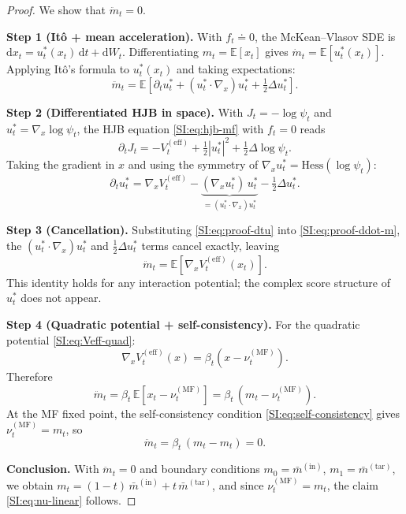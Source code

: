 \documentclass[11pt,onecolumn]{article}
\newcommand{\dd}{\mathrm{d}}
\newcommand{\MF}{\mathrm{MF}}
\newcommand{\Veff}{V^{(\mathrm{eff})}}
\begin{document}
\begin{proof}
We show that $\ddot m_t = 0$.
\medskip

\noindent\textbf{Step 1 (It\^o + mean acceleration).}
With $f_t\doteq 0$, the McKean--Vlasov SDE is
$\dd x_t = u_t^*(x_t)\,\dd t + \dd W_t$.
Differentiating $m_t = \mathbb{E}[x_t]$ gives
$\dot m_t = \mathbb{E}[u_t^*(x_t)]$.
Applying It\^o's formula to $u_t^*(x_t)$ and taking expectations:
\begin{equation}
  \ddot m_t
  = \mathbb{E}\!\left[
      \partial_t u_t^*
      + (u_t^*\cdot\nabla_x)u_t^*
      + \tfrac{1}{2}\Delta u_t^*
    \right].
  \label{SI:eq:proof-ddot-m}
\end{equation}

\noindent\textbf{Step 2 (Differentiated HJB in space).} With $J_t = -\log\psi_t$ and $u_t^* = \nabla_x\log\psi_t$, the HJB equation \eqref{SI:eq:hjb-mf} with $f_t=0$ reads
\begin{equation*}
  \partial_t J_t= -\Veff_t + \tfrac{1}{2}|u_t^*|^2 + \tfrac{1}{2}\Delta\log\psi_t.
\end{equation*}
Taking the gradient in $x$ and using the symmetry of $\nabla_xu_t^* = \mathrm{Hess}(\log\psi_t)$:
\begin{equation}
  \partial_t u_t^*= \nabla_x\Veff_t- \underbrace{(\nabla_xu_t^*)\,u_t^*}_{=(u_t^*\cdot\nabla_x)u_t^*}- \tfrac{1}{2}\Delta u_t^*.
  \label{SI:eq:proof-dtu}
\end{equation}

\noindent\textbf{Step 3 (Cancellation).} Substituting \eqref{SI:eq:proof-dtu} into \eqref{SI:eq:proof-ddot-m}, the $(u_t^*\cdot\nabla_x)u_t^*$ and $\tfrac{1}{2}\Delta u_t^*$ terms cancel exactly, leaving
\begin{equation*}
  \ddot m_t = \mathbb{E}\!\left[\nabla_x\Veff_t(x_t)\right].
\end{equation*}
This identity holds for any interaction potential; the complex score structure of $u_t^*$ does not appear.

\noindent\textbf{Step 4 (Quadratic potential + self-consistency).} For the quadratic potential \eqref{SI:eq:Veff-quad}:
\begin{equation*}
  \nabla_x\Veff_t(x) = \beta_t(x - \nu_t^{(\MF)}).
\end{equation*}
Therefore
\begin{equation*}
  \ddot m_t
  = \beta_t\,\mathbb{E}[x_t - \nu_t^{(\MF)}]
  = \beta_t\,(m_t - \nu_t^{(\MF)}).
\end{equation*}
At the MF fixed point, the self-consistency condition
\eqref{SI:eq:self-consistency} gives $\nu_t^{(\MF)} = m_t$, so
\begin{equation*}
  \ddot m_t = \beta_t\,(m_t - m_t) = 0.
\end{equation*}

\noindent\textbf{Conclusion.}
With $\ddot m_t = 0$ and boundary conditions
$m_0 = \bar m^{(\mathrm{in})}$, $m_1 = \bar m^{(\mathrm{tar})}$,
we obtain $m_t = (1-t)\,\bar m^{(\mathrm{in})} + t\,\bar m^{(\mathrm{tar})}$,
and since $\nu_t^{(\MF)} = m_t$, the claim \eqref{SI:eq:nu-linear} follows.
\end{proof}
\end{document}
